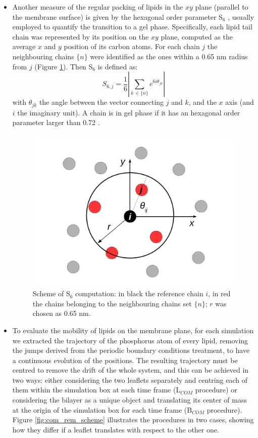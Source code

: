 \begin{itemize}
\item Another measure of the regular packing of lipids in the $xy$ plane (parallel to the membrane surface) is given by the hexagonal order parameter S$_6$ \citep{Uppulury2015}, usually employed to quantify the transition to a gel phase. Specifically, each lipid tail chain was represented by its position on the $xy$ plane, computed as the average $x$ and $y$ position of its carbon atoms.
%
For each chain $j$ the neighbouring chains $\{n\}$ were identified as the ones within a 0.65 nm radius from $j$ (Figure \ref{fig:S6_theory}). Then S$_6$ is defined as:
\begin{equation}
S_{6,j} = \frac{1}{6} \left| \sum_{k \,\in \{n\}} e^{6i\theta_{jk}} \right|
\end{equation}
with $\theta_{jk}$ the angle between the vector connecting $j$ and $k$, and the $x$ axis (and $i$ the imaginary unit). A chain is in gel phase if it has an hexagonal order parameter larger than 0.72 \citep{Uppulury2015}.
%
\begin{figure}[t!]
\centering
\includegraphics[width=0.55\linewidth]{3results_capsule/pics/s6_theory.pdf}
\caption[Scheme of S$_6$ computation]{Scheme of S$_6$ computation: in black the reference chain $i$, in red the chains belonging to the neighbouring chains set $\{n\}$; $r$ was chosen as 0.65 nm.} \label{fig:S6_theory}
\end{figure}

\item To evaluate the mobility of lipids on the membrane plane, for each simulation we extracted the trajectory of the phosphorus atom of every lipid, removing the jumps derived from the periodic boundary conditions treatment, to have a continuous evolution of the positions. The resulting trajectory must be centred to remove the drift of the whole system, and this can be achieved in two ways: either considering the two leaflets separately and centring each of them within the simulation box at each time frame (L$_{COM}$ procedure) or considering the bilayer as a unique object and translating its center of mass at the origin of the simulation box for each time frame (B$_{COM}$ procedure). Figure \ref{fig:com_rem_scheme} illustrates the procedures in two cases, showing how they differ if a leaflet translates with respect to the other one.


\end{itemize}
